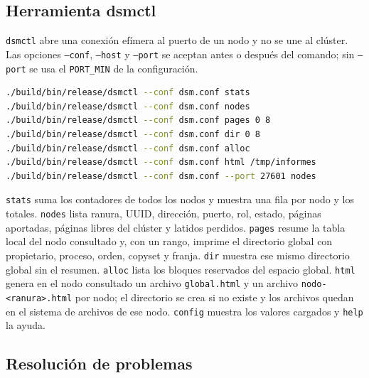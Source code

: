 \documentclass[11pt,spanish]{article}
\begin{document}
\subsection{Herramienta dsmctl}

\texttt{dsmctl} abre una conexión efímera al puerto de un nodo y no se une al clúster. Las opciones \texttt{--conf}, \texttt{--host} y \texttt{--port} se aceptan antes o después del comando; sin \texttt{--port} se usa el \texttt{PORT\_MIN} de la configuración.
\begin{lstlisting}[language=bash]
./build/bin/release/dsmctl --conf dsm.conf stats
./build/bin/release/dsmctl --conf dsm.conf nodes
./build/bin/release/dsmctl --conf dsm.conf pages 0 8
./build/bin/release/dsmctl --conf dsm.conf dir 0 8
./build/bin/release/dsmctl --conf dsm.conf alloc
./build/bin/release/dsmctl --conf dsm.conf html /tmp/informes
./build/bin/release/dsmctl --conf dsm.conf --port 27601 nodes
\end{lstlisting}
\texttt{stats} suma los contadores de todos los nodos y muestra una fila por nodo y los totales. \texttt{nodes} lista ranura, UUID, dirección, puerto, rol, estado, páginas aportadas, páginas libres del clúster y latidos perdidos. \texttt{pages} resume la tabla local del nodo consultado y, con un rango, imprime el directorio global con propietario, proceso, orden, copyset y franja. \texttt{dir} muestra ese mismo directorio global sin el resumen. \texttt{alloc} lista los bloques reservados del espacio global. \texttt{html} genera en el nodo consultado un archivo \texttt{global.html} y un archivo \texttt{nodo-<ranura>.html} por nodo; el directorio se crea si no existe y los archivos quedan en el sistema de archivos de ese nodo. \texttt{config} muestra los valores cargados y \texttt{help} la ayuda.

\subsection{Resolución de problemas}
\end{document}
